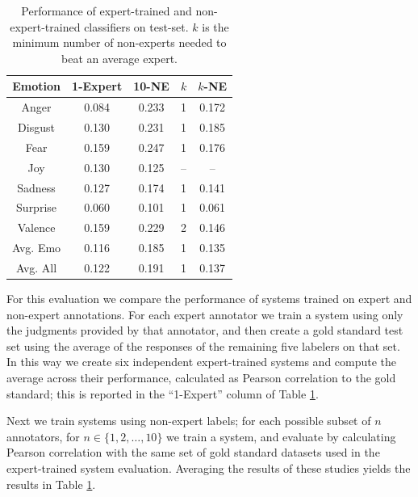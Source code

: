 \documentclass[11pt]{article}
\newlength{\tableReduceBot}
\begin{document}
\begin{table}[h]
\footnotesize
    \begin{center}
        \begin{tabular}{|c||c|c|c|c|}
        \hline
        Emotion & 1-Expert & 10-NE & $k$ & $k$-NE \\
        \hline
        Anger & 0.084 & 0.233 & 1 & 0.172 \\
        Disgust & 0.130 & 0.231 & 1 & 0.185 \\
        Fear & 0.159 & 0.247 & 1 & 0.176 \\
        Joy & 0.130 & 0.125 & -- & -- \\
        Sadness & 0.127 & 0.174 & 1 & 0.141 \\
        Surprise & 0.060 & 0.101 & 1 & 0.061 \\
        Valence & 0.159 & 0.229 & 2 & 0.146 \\
        \hline
        Avg. Emo & 0.116 & 0.185 & 1 & 0.135 \\
        Avg. All & 0.122 & 0.191 & 1 & 0.137 \\
        \hline
        \end{tabular}

    \caption{Performance of expert-trained and non-expert-trained classifiers on test-set.  $k$ is the minimum number of non-experts needed to beat an average expert.}\label{affectSWAT}
\end{center}
\end{table}

For this evaluation we compare the performance of systems
trained on expert and non-expert annotations.
For each expert annotator we train a system using only
the judgments provided by that annotator, and then create a gold
standard test set using the average of the responses of the remaining
five labelers on that set.  In this way we create six independent
expert-trained systems and compute the average across their
performance, calculated as Pearson correlation to the gold standard;
this is reported in the ``1-Expert'' column of Table \ref{affectSWAT}.

Next we train systems using non-expert labels;  for each possible
subset of $n$ annotators, for $n \in \{1, 2, \ldots, 10\}$ we
train a system, and evaluate by calculating Pearson correlation
with the same set of gold standard datasets used in the expert-trained
system evaluation. Averaging the results of these studies yields the results in Table \ref{affectSWAT}. %
\end{document}

